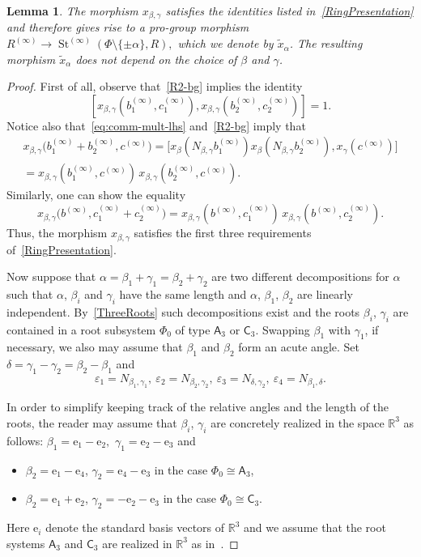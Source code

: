 \documentclass{article}
\numberwithin{equation}{section}
\newtheorem{lemma}{Lemma} \numberwithin{lemma}{section}
\theoremstyle{definition}
\theoremstyle{remark}
\DeclareMathOperator\St{St}
\newcommand{\rA}{\mathsf{A}}
\newcommand{\rC}{\mathsf{C}}
\begin{document}
\begin{lemma}\label{lem:new-root}
 The morphism $x_{\beta, \gamma}$ satisfies the identities listed in~\cref{RingPresentation} and therefore gives rise to a pro-group morphism $R^{(\infty)} \to \St^{(\infty)}(\Phi\setminus\{\pm\alpha\}, R),$ which we denote by $\widetilde{x}_\alpha$. The resulting morphism $\widetilde{x}_\alpha$ does not depend on the choice of $\beta$ and $\gamma$.
\end{lemma}
\begin{proof}
 First of all, observe that~\eqref{R2-bg} implies the identity \[[x_{\beta, \gamma}(b_1^{(\infty)}, c_1^{(\infty)}),
 x_{\beta, \gamma}(b_2^{(\infty)}, c_2^{(\infty)})] = 1.\] 
 Notice also that~\eqref{eq:comm-mult-lhs} and~\eqref{R2-bg} imply that
 \begin{align*}
 x_{\beta, \gamma}\bigl(b_1^{(\infty)} + b_2^{(\infty)}, c^{(\infty)}\bigr)
 = \bigl[x_\beta(N_{\beta, \gamma} b_1^{(\infty)})
 x_\beta(N_{\beta, \gamma} b_2^{(\infty)}),
 x_\gamma(c^{(\infty)})\bigr]\\
 = x_{\beta, \gamma}(b_1^{(\infty)}, c^{(\infty)})\,
 x_{\beta, \gamma}(b_2^{(\infty)}, c^{(\infty)}).
 \end{align*}
 Similarly, one can show the equality
 \[x_{\beta, \gamma}\bigl(b^{(\infty)}, c_1^{(\infty)} + c_2^{(\infty)}\bigr)
 = x_{\beta, \gamma}(b^{(\infty)}, c_1^{(\infty)})\,
 x_{\beta, \gamma}(b^{(\infty)}, c_2^{(\infty)}).\]
 Thus, the morphism \(x_{\beta, \gamma}\) satisfies the first three requirements of~\cref{RingPresentation}. 
 
 Now suppose that \(\alpha = \beta_1 + \gamma_1 = \beta_2 + \gamma_2\) are two different decompositions for $\alpha$ such that $\alpha$, $\beta_i$ and $\gamma_i$ have the same length and \(\alpha\), \(\beta_1\), \(\beta_2\) are linearly independent. By~\cref{ThreeRoots} such decompositions exist and the roots $\beta_i$, $\gamma_i$ are contained in a root subsystem $\Phi_0$ of type \(\rA_3\) or \(\rC_3\). Swapping $\beta_1$ with $\gamma_1$, if necessary, we also may assume that $\beta_1$ and $\beta_2$ form an acute angle. Set $\delta = \gamma_1 - \gamma_2 = \beta_2 - \beta_1$ and \[\varepsilon_1 = N_{\beta_1, \gamma_1},\ \varepsilon_2 = N_{\beta_2, \gamma_2},\ \varepsilon_3 = N_{\delta,\gamma_2},\ \varepsilon_4 = N_{\beta_1, \delta}.\]
 
In order to simplify keeping track of the relative angles and the length of the roots, the reader may assume that  $\beta_i$, $\gamma_i$ are concretely realized in the space $\mathbb{R}^3$ as follows:
\(\beta_1 = \mathrm e_1 - \mathrm e_2,\) \(\gamma_1 = \mathrm e_2 - \mathrm e_3\) and
 \begin{itemize}
 \item $\beta_2 = \mathrm e_1 - \mathrm e_4$, $\gamma_2 = \mathrm e_4 - \mathrm e_3$ in the case \(\Phi_0\cong\rA_3\), \item $\beta_2 = \mathrm e_1 + \mathrm e_2$, $\gamma_2 = -\mathrm e_2 - \mathrm e_3$ in the case \(\Phi_0\cong\rC_3\).
\end{itemize}
Here $\mathrm e_i$ denote the standard basis vectors of $\mathbb{R}^3$ and we assume that the root systems $\rA_3$ and $\rC_3$ are realized in $\mathbb{R}^3$ as in~\cite[Ch.~VI,~\S\S~4.6--4.7]{Bou81}. 



\end{proof}
\end{document}
